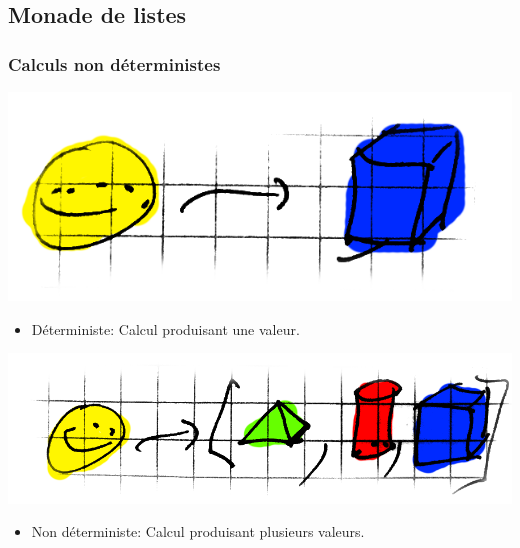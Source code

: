 \documentclass{beamer}
\begin{document}
\subsection{Monade de listes}
\begin{frame}
  \frametitle{Calculs non déterministes}
  \begin{center}
    \includegraphics[scale=0.2]{deter-geometric}
  \end{center}
  \begin{block}{}
    \begin{itemize}
      \item Déterministe: Calcul produisant une valeur.
    \end{itemize}
  \end{block}
  \medskip
  \begin{center}
    \includegraphics[scale=0.2]{non-deter-geometric}
  \end{center}
  \begin{block}{}
    \begin{itemize}
      \item Non déterministe: Calcul produisant plusieurs valeurs.
    \end{itemize}
  \end{block}
\end{frame}
\end{document}
